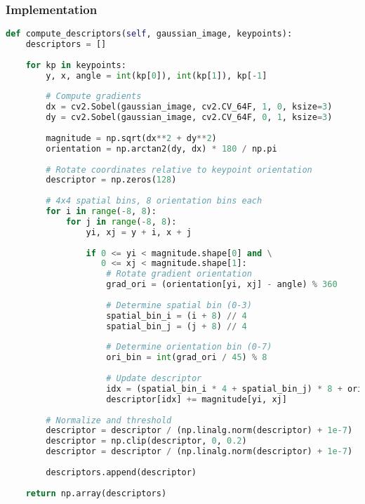 \documentclass[12pt,a4paper]{article}
\begin{document}
\subsubsection{Implementation}
\begin{lstlisting}[language=Python]
def compute_descriptors(self, gaussian_image, keypoints):
    descriptors = []
    
    for kp in keypoints:
        y, x, angle = int(kp[0]), int(kp[1]), kp[-1]
        
        # Compute gradients
        dx = cv2.Sobel(gaussian_image, cv2.CV_64F, 1, 0, ksize=3)
        dy = cv2.Sobel(gaussian_image, cv2.CV_64F, 0, 1, ksize=3)
        
        magnitude = np.sqrt(dx**2 + dy**2)
        orientation = np.arctan2(dy, dx) * 180 / np.pi
        
        # Rotate coordinates relative to keypoint orientation
        descriptor = np.zeros(128)
        
        # 4x4 spatial bins, 8 orientation bins each
        for i in range(-8, 8):
            for j in range(-8, 8):
                yi, xj = y + i, x + j
                
                if 0 <= yi < magnitude.shape[0] and \
                   0 <= xj < magnitude.shape[1]:
                    # Rotate gradient orientation
                    grad_ori = (orientation[yi, xj] - angle) % 360
                    
                    # Determine spatial bin (0-3)
                    spatial_bin_i = (i + 8) // 4
                    spatial_bin_j = (j + 8) // 4
                    
                    # Determine orientation bin (0-7)
                    ori_bin = int(grad_ori / 45) % 8
                    
                    # Update descriptor
                    idx = (spatial_bin_i * 4 + spatial_bin_j) * 8 + ori_bin
                    descriptor[idx] += magnitude[yi, xj]
        
        # Normalize and threshold
        descriptor = descriptor / (np.linalg.norm(descriptor) + 1e-7)
        descriptor = np.clip(descriptor, 0, 0.2)
        descriptor = descriptor / (np.linalg.norm(descriptor) + 1e-7)
        
        descriptors.append(descriptor)
    
    return np.array(descriptors)
\end{lstlisting}
\end{document}
